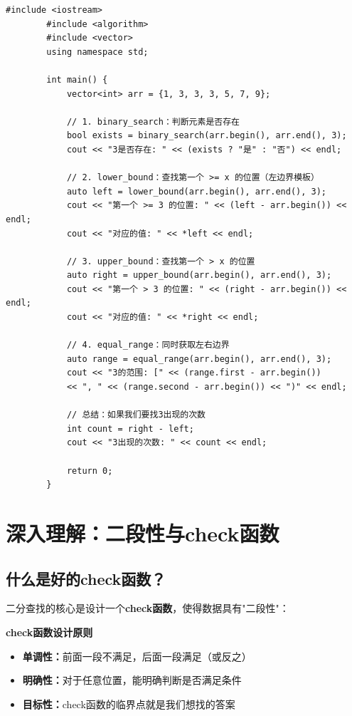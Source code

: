 \documentclass[12pt,a4paper]{article}
\begin{document}
	\begin{lstlisting}[caption={STL二分查找函数使用示例}]
		#include <iostream>
		#include <algorithm>
		#include <vector>
		using namespace std;
		
		int main() {
			vector<int> arr = {1, 3, 3, 3, 5, 7, 9};
			
			// 1. binary_search：判断元素是否存在
			bool exists = binary_search(arr.begin(), arr.end(), 3);
			cout << "3是否存在: " << (exists ? "是" : "否") << endl;
			
			// 2. lower_bound：查找第一个 >= x 的位置（左边界模板）
			auto left = lower_bound(arr.begin(), arr.end(), 3);
			cout << "第一个 >= 3 的位置: " << (left - arr.begin()) << endl;
			cout << "对应的值: " << *left << endl;
			
			// 3. upper_bound：查找第一个 > x 的位置
			auto right = upper_bound(arr.begin(), arr.end(), 3);
			cout << "第一个 > 3 的位置: " << (right - arr.begin()) << endl;
			cout << "对应的值: " << *right << endl;
			
			// 4. equal_range：同时获取左右边界
			auto range = equal_range(arr.begin(), arr.end(), 3);
			cout << "3的范围: [" << (range.first - arr.begin()) 
			<< ", " << (range.second - arr.begin()) << ")" << endl;
			
			// 总结：如果我们要找3出现的次数
			int count = right - left;
			cout << "3出现的次数: " << count << endl;
			
			return 0;
		}
	\end{lstlisting}
	
	\section{深入理解：二段性与check函数}
	
	\subsection{什么是好的check函数？}
	
	二分查找的核心是设计一个\textbf{check函数}，使得数据具有"二段性"：
	
	\begin{bluebox}
		\textbf{check函数设计原则}
		
		\begin{itemize}
			\item \textbf{单调性：}前面一段不满足，后面一段满足（或反之）
			\item \textbf{明确性：}对于任意位置，能明确判断是否满足条件
			\item \textbf{目标性：}check函数的临界点就是我们想找的答案
		\end{itemize}
	\end{bluebox}
	
\end{document}
